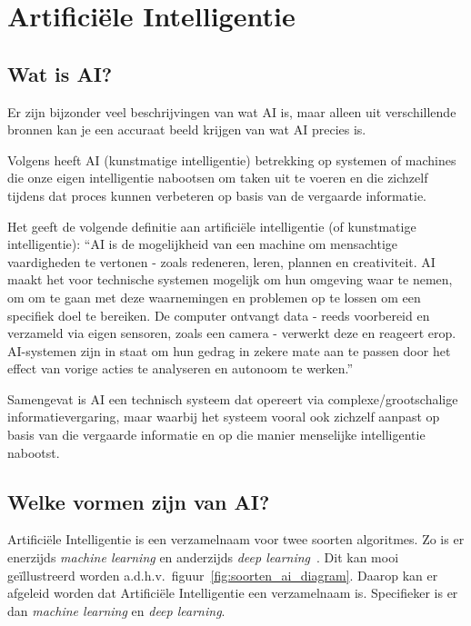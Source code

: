 \clearpage

\section{Artificiële Intelligentie}
\subsection{Wat is AI?}
Er zijn bijzonder veel beschrijvingen van wat AI is, maar alleen uit verschillende bronnen kan je een accuraat beeld krijgen van wat AI precies is.

Volgens \textcite{Oracle2014} heeft AI (kunstmatige intelligentie) betrekking op systemen of machines die onze eigen intelligentie nabootsen om taken uit te voeren en die zichzelf tijdens dat proces kunnen verbeteren op basis van de vergaarde informatie.

Het \textcite{EuropeesParlement2020} geeft de volgende definitie aan artificiële intelligentie (of kunstmatige intelligentie): ``AI is de mogelijkheid van een machine om mensachtige vaardigheden te vertonen - zoals redeneren, leren, plannen en creativiteit.
AI maakt het voor technische systemen mogelijk om hun omgeving waar te nemen, om om te gaan met deze waarnemingen en problemen op te lossen om een specifiek doel te bereiken. De computer ontvangt data - reeds voorbereid en verzameld via eigen sensoren, zoals een camera - verwerkt deze en reageert erop.
AI-systemen zijn in staat om hun gedrag in zekere mate aan te passen door het effect van vorige acties te analyseren en autonoom te werken.''

Samengevat is AI een technisch systeem dat opereert via complexe/grootschalige informatievergaring, maar waarbij het systeem vooral ook zichzelf aanpast op basis van die vergaarde informatie en op die manier menselijke intelligentie nabootst.

\subsection{Welke vormen zijn van AI?}
Artificiële Intelligentie is een verzamelnaam voor twee soorten algoritmes. Zo is er enerzijds \textit{machine learning} en anderzijds \textit{deep learning}~\autocite{Kavlakoglu2020}.
Dit kan mooi geïllustreerd worden a.d.h.v.\ figuur~\ref{fig:soorten_ai_diagram}. Daarop kan er afgeleid worden dat Artificiële Intelligentie een verzamelnaam is. Specifieker is er dan \textit{machine learning} en \textit{deep learning}.

